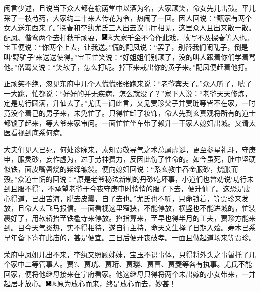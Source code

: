 闲言少述，且说当下众人都在榆荫堂中以酒为名，大家顽笑，命女先儿击鼓。平儿采了一枝芍药，大家约二十来人传花为令，热闹了一回。因人回说：“甄家有两个女人送东西来了。”探春和李纨尤氏三人出去议事厅相见，这里众人且出来散一散。配凤、偕鸾两个去打秋千顽耍，{\includegraphics[width=3mm]{../Images/00003}\includegraphics[width=3mm]{../Images/00012}\footnotesize \kaishu 大家千金不令作此戏，故写不及探春等人也。}宝玉便说：“你两个上去，让我送。”慌的配凤说：“罢了，别替我们闹乱子，倒是叫‘野驴子’来送送使得。”宝玉忙笑说：“好姐姐们别顽了，没的叫人跟着你们学着骂他。”偕鸾又说：“笑软了，怎么打呢。掉下来栽出你的黄子来。”配凤便赶着他打。

正顽笑不绝，忽见东府中几个人慌慌张张跑来说：“老爷宾天了。”众人听了，唬了一大跳，忙都说：“好好的并无疾病，怎么就没了？”家下人说：“老爷天天修炼，定是功行圆满，升仙去了。”尤氏一闻此言，又见贾珍父子并贾琏等皆不在家，一时竟没个着己的男子来，未免忙了。只得忙卸了妆饰，命人先到玄真观将所有的道士都锁了起来，等大爷来家审问。一面忙忙坐车带了赖升一干家人媳妇出城。又请太医看视到底系何病。

大夫们见人已死，何处诊脉来，素知贾敬导气之术总属虚诞，更至参星礼斗，守庚申，服灵砂，妄作虚为，过于劳神费力，反因此伤了性命的。如今虽死，肚中坚硬似铁，面皮嘴唇烧的紫绛皱裂。便向媳妇回说：“系玄教中吞金服砂，烧胀而殁。”众道士慌的回说：“原是老爷秘法新制的丹砂吃坏事，小道们也曾劝说‘功行未到且服不得’，不承望老爷于今夜守庚申时悄悄的服了下去，便升仙了。这恐是虔心得道，已出苦海，脱去皮囊，自了去也。”尤氏也不听，只命锁着，等贾珍来发放，且命人去飞马报信。一面看视这里窄狭，不能停放，横竖也不能进城的，忙装裹好了，用软轿抬至铁槛寺来停放。掐指算来，至早也得半月的工夫，贾珍方能来到。目今天气炎热，实不得相待，遂自行主持，命天文生择了日期入殓。寿木已系早年备下寄在此庙的，甚是便宜。三日后便开丧破孝。一面且做起道场来等贾珍。

荣府中凤姐儿出不来，李纨又照顾姊妹，宝玉不识事体，只得将外头之事暂托了几个家中二等管事人。贾?、贾珖、贾珩、贾璎、贾菖、贾菱等各有执事。尤氏不能回家，便将他继母接来在宁府看家。他这继母只得将两个未出嫁的小女带来，一并起居才放心。{\includegraphics[width=3mm]{../Images/00003}\includegraphics[width=3mm]{../Images/00012}\footnotesize \kaishu 原为放心而来，终是放心而去，妙甚！}

